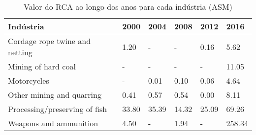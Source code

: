 \begin{table}
\centering
\caption{Valor do RCA ao longo dos anos para cada indústria (ASM)}
\begin{tabular}{p{6cm}p{1.5cm}p{1.5cm}p{1.5cm}p{1.5cm}p{1.5cm}}
\toprule
                     Indústria &  2000 &  2004 &  2008 &  2012 &   2016 \\
\midrule
Cordage rope twine and netting &  1.20 &     - &     - &  0.16 &   5.62 \\
           Mining of hard coal &     - &     - &     - &     - &  11.05 \\
                   Motorcycles &     - &  0.01 &  0.10 &  0.06 &   4.64 \\
     Other mining and quarring &  0.41 &  0.57 &  0.54 &  0.00 &   8.11 \\
 Processing/preserving of fish & 33.80 & 35.39 & 14.32 & 25.09 &  69.26 \\
        Weapons and ammunition &  4.50 &     - &  1.94 &     - & 258.34 \\
\bottomrule
\end{tabular}
\end{table}
